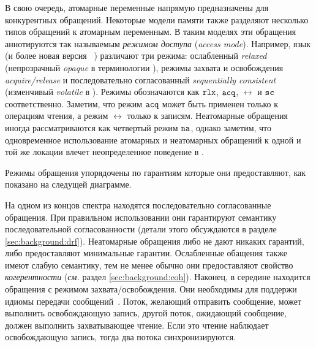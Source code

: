 В свою очередь, атомарные переменные напрямую 
предназначены для конкурентных обращений. 
Некоторые модели памяти также разделяют 
несколько типов обращений к атомарным переменным.
В таким моделях эти обращения аннотируются 
так называемым \emph{режимом доступа} (\emph{access mode}).
Например, язык \CPP (и более новая версия \Java~\cite{Bender-Palsberg:OOPSLA19})
различают три режима: ослабленный \emph{relaxed}
(непрозрачный \emph{opaque} в терминологии \Java),
режимы захвата и освобождения \emph{acquire/release} 
и последовательно согласованный \emph{sequentially consistent}
(изменчивый \emph{volatile} в \Java). 
Режимы обозначаются как $\mathtt{rlx}$, ${\mathtt{acq}}$, $\rel$ и ${\mathtt{sc}}$ соответственно.
Заметим, что режим ${\mathtt{acq}}$ может быть применен только к операциям чтения,
а режим $\rel$ только к записям.
Неатомарные обращения иногда рассматриваются как четвертый режим $\mathtt{na}$, 
однако заметим, что одновременное использование атомарных 
и неатомарных обращений к одной и той же локации 
влечет неопределенное поведение в \CPP.

Режимы обращения упорядочены по гарантиям 
которые они предоставляют, как показано на следущей диаграмме. 




На одном из концов спектра находятся последовательно согласованные обращения.
При правильном использовании они гарантируют семантику 
последовательной согласованности
(детали этого обсуждаются в разделе \cref{sec:background:drf}).
Неатомарные обращения либо не дают никаких гарантий, 
либо предоставляют минимальные гарантии. 
Ослабленные обащения также имеют слабую семантику, 
тем не менее обычно они предоставляют свойство \emph{когерентности}
(\emph{см.} раздел \cref{sec:background:coh}).
Наконец, в середине находится обращения с режимом захвата/освобождения. 
Они необходимы для поддержи идиомы передачи сообщений~\cite{Lahav-al:POPL16}.
Поток, желающий отправить сообщение, может выполнить освобождающую запись, 
другой поток, ожидающий сообщение, должен выполнить захватывающее чтение. 
Если это чтение наблюдает освобождающую запись, 
тогда два потока синхронизируются.

